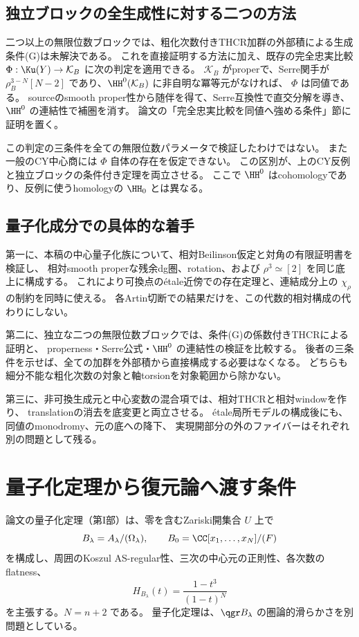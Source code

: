\subsection{独立ブロックの全生成性に対する二つの方法}

二つ以上の無限位数ブロックでは、粗化次数付きTHCR加群の外部積による生成条件(G)は未解決である。
これを直接証明する方法に加え、既存の完全忠実比較
\(\Phi:\Ku(Y)\to\mathcal K_B\) に次の判定を適用できる。
\(\mathcal K_B\) がproperで、Serre関手が
\(\rho_B^{3-N}[N-2]\) であり、\(\HH^0(\mathcal K_B)\) に非自明な冪等元がなければ、
\(\Phi\) は同値である。
sourceのsmooth proper性から随伴を得て、Serre互換性で直交分解を導き、
\(\HH^0\) の連結性で補圏を消す。
論文の「完全忠実比較を同値へ強める条件」節に証明を置く。

この判定の三条件を全ての無限位数パラメータで検証したわけではない。
また一般のCY中心商には \(\Phi\) 自体の存在を仮定できない。
この区別が、上のCY反例と独立ブロックの条件付き定理を両立させる。
ここで \(\HH^0\) はcohomologyであり、反例に使うhomologyの \(\HH_0\) とは異なる。

\subsection{量子化成分での具体的な着手}

第一に、本稿の中心量子化族について、相対Beilinson仮定と対角の有限証明書を検証し、
相対smooth properな残余dg圏、rotation、および \(\rho^3\simeq[2]\) を同じ底上に構成する。
これにより可換点のétale近傍での存在定理と、連結成分上の \(\chi_\rho\) の制約を同時に使える。
各Artin切断での結果だけを、この代数的相対構成の代わりにしない。

第二に、独立な二つの無限位数ブロックでは、条件(G)の係数付きTHCRによる証明と、
properness・Serre公式・\(\HH^0\) の連結性の検証を比較する。
後者の三条件を示せば、全ての加群を外部積から直接構成する必要はなくなる。
どちらも細分不能な粗化次数の対象と軸torsionを対象範囲から除かない。

第三に、非可換生成元と中心変数の混合項では、相対THCRと相対windowを作り、
translationの消去を底変更と両立させる。
étale局所モデルの構成後にも、同値のmonodromy、元の底への降下、
実現開部分の外のファイバーはそれぞれ別の問題として残る。

\section{量子化定理から復元論へ渡す条件}

論文の量子化定理（第I部）は、零を含むZariski開集合 \(U\) 上で
\[
 B_\lambda=A_\lambda/(\Omega_\lambda),\qquad
 B_0=\CC[x_1,\ldots,x_N]/(F)
\]
を構成し、周囲のKoszul AS-regular性、三次の中心元の正則性、各次数のflatness、
\[
 H_{B_\lambda}(t)=\frac{1-t^3}{(1-t)^N}
\]
を主張する。\(N=n+2\) である。
量子化定理は、\(\qgr B_\lambda\) の圏論的滑らかさを別問題としている。

